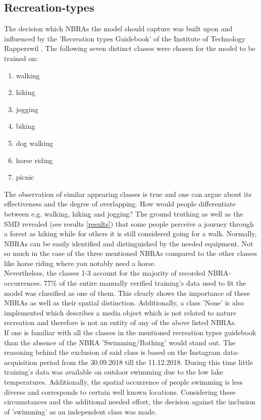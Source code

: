 \subsection{Recreation-types} \label{recreation_types}
The decision which NBRAs the model should capture was built upon and influenced by the 'Recreation types Guidebook' of the Institute of Technology Rapperswil \parencite{IFL2018}. The following seven distinct classes were chosen for the model to be trained on:
\begin{enumerate}
    \item walking
    \item hiking
    \item jogging
    \item biking
    \item dog walking
    \item horse riding
    \item picnic
\end{enumerate}
The observation of similar appearing classes is true and one can argue about its effectiveness and the degree of overlapping. How would people differentiate between e.g. walking, hiking and jogging? The ground truthing as well as the SMD revealed (see results \ref{results}) that some people perceive a journey through a forest as hiking while for others it is still considered going for a walk. Normally, NBRAs can be easily identified and distinguished by the needed equipment. Not so much in the case of the three mentioned NBRAs compared to the other classes like horse riding where you notably need a horse.\\
Nevertheless, the classes 1-3 account for the majority of recorded NBRA-occurrences. 77\% of the entire manually verified training's data used to fit the model was classified as one of them. This clearly shows the importance of these NBRAs as well as their spatial distinction.
Additionally, a class 'None' is also implemented which describes a media object which is not related to nature recreation and therefore is not an entity of any of the above listed NBRAs.\\
\newline
If one is familiar with all the classes in the mentioned recreation types guidebook \parencite{IFL2018} than the absence of the NBRA 'Swimming/Bathing' would stand out. The reasoning behind the exclusion of said class is based on the Instagram data-acquisition period from the 30.09.2018 till the 11.12.2018. During this time little training's data was available on outdoor swimming due to the low lake temperatures. Additionally, the spatial occurrence of people swimming is less diverse and corresponds to certain well known locations. Considering these circumstances and the additional needed effort, the decision against the inclusion of 'swimming' as an independent class was made.

